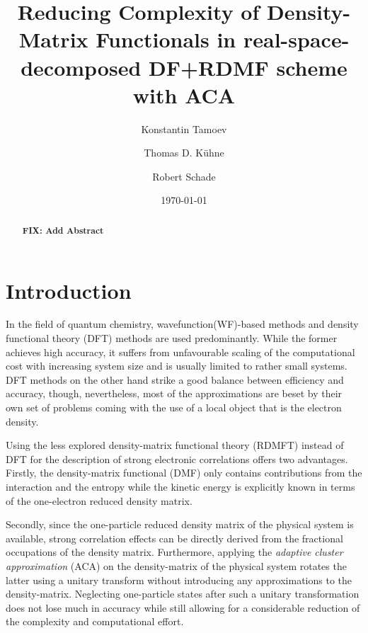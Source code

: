 \documentclass[%
 reprint,
nofootinbib,
 amsmath,amssymb,
 aps,
]{revtex4-2}
\begin{document}

\title{Reducing Complexity of Density-Matrix Functionals in real-space-decomposed DF+RDMF scheme with ACA}

\author{Konstantin Tamoev}
\author{Thomas D. Kühne}
\author{Robert Schade}
\date{\today}%

\begin{abstract}
\textbf{FIX: Add Abstract}
\end{abstract}

\maketitle

\section{Introduction}
In the field of quantum chemistry, wavefunction(WF)-based methods and density functional theory (DFT) methods are used predominantly. While the former achieves high accuracy, it suffers from unfavourable scaling of the computational cost with increasing system size and is usually limited to rather small systems. DFT methods on the other hand strike a good balance between efficiency and accuracy, though, nevertheless, most of the approximations are beset by their own set of problems coming with the use of a local object that is the electron density. \cite{Pernal2015}

Using the less explored density-matrix functional theory (RDMFT)\cite{Gilbert1975} instead of DFT for the description of strong electronic correlations offers two advantages. Firstly, the density-matrix functional (DMF) only contains contributions from the interaction and the entropy while the kinetic energy is explicitly known in terms of the one-electron reduced density matrix. \cite{Pernal2015} 

Secondly, since the one-particle reduced density matrix of the physical system is available, strong correlation effects can be directly derived from the fractional occupations of the density matrix.
Furthermore, applying the \textit{adaptive cluster approximation} (ACA) on the density-matrix of the physical system rotates the latter using a unitary transform without introducing any approximations to the density-matrix. Neglecting one-particle states after such a unitary transformation does not lose much in accuracy while still allowing for a considerable reduction of the complexity and computational effort. 
\end{document}
